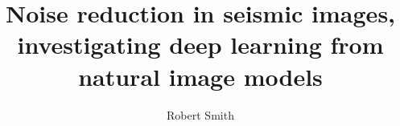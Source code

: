 \documentclass[final-report]{report-template}
\title{Noise reduction in seismic images, investigating deep learning from natural image models}
\author{Robert Smith}
\begin{document}
\maketitlepage  %


\end{document}

